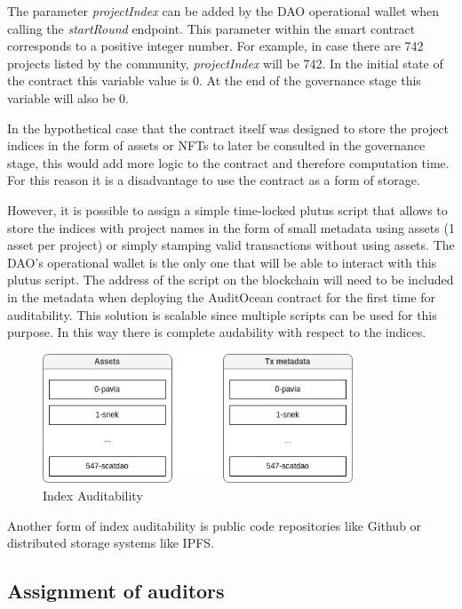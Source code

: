 \documentclass[9pt]{article}
\begin{document}
The parameter \emph{ projectIndex } can be added by the DAO operational wallet when calling the \emph{startRound} endpoint. This parameter within the smart contract corresponds to a positive integer number. For example, in case there are 742 projects listed by the community, \emph{ projectIndex } will be 742. In the initial state of the contract this variable value is 0. At the end of the governance stage this variable will also be 0.

In the hypothetical case that the contract itself was designed to store the project indices in the form of assets or NFTs to later be consulted in the governance stage, this would add more logic to the contract and therefore computation time. For this reason it is a disadvantage to use the contract as a form of storage.

However, it is possible to assign a simple time-locked plutus script that allows to store the indices with project names in the form of small metadata using assets (1 asset per project) or simply stamping valid transactions without using assets. The DAO's operational wallet is the only one that will be able to interact with this plutus script. The address of the script on the blockchain will need to be included in the metadata when deploying the AuditOcean contract for the first time for auditability. This solution is scalable since multiple scripts can be used for this purpose. In this way there is complete audability with respect to the indices.


\begin{figure}[ht]
  \centering
  \includegraphics[width=0.822\textwidth]{indices.png}
  \caption{Index Auditability
  }
  \label{fig:mi_imagen}
\end{figure}

Another form of index auditability is public code repositories like Github or distributed storage systems like IPFS.
\subsection { Assignment of auditors }
   
\end{document}
